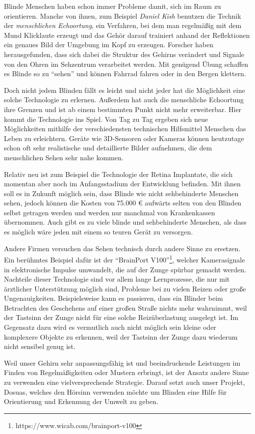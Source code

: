 \documentclass[a4paper,12pt,ngerman]{scrartcl}
\begin{document}
Blinde Menschen haben schon immer Probleme damit, sich im Raum zu orientieren.
Manche von ihnen, zum Beispiel \textit{Daniel Kish} benutzen die Technik der 
\textit{menschlichen Echoortung}, ein Verfahren, bei dem
man regelmäßig mit dem Mund Klicklaute erzeugt und das Gehör darauf trainiert 
anhand der Reflektionen ein genaues Bild der Umgebung im Kopf zu erzeugen.
Forscher haben herausgefunden, dass sich dabei die Struktur des Gehirns verändert 
und Signale von den Ohren im Sehzentrum verarbeitet werden.
Mit genügend Übung schaffen es Blinde so zu \enquote{sehen} und können Fahrrad 
fahren oder in den Bergen klettern. \par 
Doch nicht jedem Blinden fällt es leicht und nicht jeder hat die Möglichkeit eine
solche Technologie zu erlernen. Außerdem hat auch die menschliche Echoortung ihre
Grenzen und ist ab einem bestimmten Punkt nicht mehr erweiterbar. Hier kommt die 
Technologie ins Spiel. Von Tag zu Tag ergeben sich neue Möglichkeiten mithilfe 
der verschiedensten technischen Hilfsmittel Menschen das Leben zu erleichtern.
Geräte wie 3D-Sensoren oder Kameras können heutzutage schon oft sehr realistische
und detaillierte Bilder aufnehmen, die dem menschlichen Sehen sehr nahe kommen. \par 
Relativ neu ist zum Beispiel die Technologie der Retina Implantate, die sich 
momentan aber noch im Anfangsstadium der Entwicklung befinden. Mit ihnen soll es in 
Zukunft möglich sein, dass Blinde wie nicht sehbehinderte Menschen sehen, jedoch
können die Kosten von 75.000 \euro{} aufwärts selten von den Blinden selbst getragen
werden und werden nur manchmal von Krankenkassen übernommen. Auch gibt es zu viele
blinde und sehbehinderte Menschen, als dass es möglich wäre jeden mit einem so 
teuren Gerät zu versorgen.\par 
Andere Firmen versuchen das Sehen technisch durch andere Sinne zu ersetzen.
Ein berühmtes Beispiel dafür ist der 
\enquote{BrainPort V100}\footnote{https://www.wicab.com/brainport-v100}, welcher 
Kamerasignale in elektronische Impulse umwandelt, die auf der Zunge spürbar
gemacht werden. Nachteile dieser
Technologie sind vor allem lange Lernprozesse, die nur mit ärztlicher Unterstützung
möglich sind, Probleme bei zu vielen Reizen oder große Ungenauigkeiten.
Beispielsweise kann es passieren, dass ein Blinder beim Betrachten des Geschehens auf 
einer großen Straße nichts mehr wahrnimmt, weil der Tastsinn der Zunge
nicht für eine 
solche Reizüberlastung ausgelegt ist. Im Gegensatz dazu wird es vermutlich auch nicht
möglich sein kleine oder komplexere Objekte zu erkennen, weil der Tastsinn der Zunge
dazu wiederum nicht sensibel genug ist. \par
Weil unser Gehirn sehr anpassungsfähig ist und beeindruckende
Leistungen im Finden von Regelmäßigkeiten oder Mustern erbringt, ist der Ansatz
andere Sinne zu verwenden eine vielversprechende Strategie. Darauf setzt auch 
unser Projekt, Dosuas, welches den Hörsinn verwenden möchte um Blinden eine Hilfe
für Orientierung und Erkennung der Umwelt zu geben.
\end{document}

